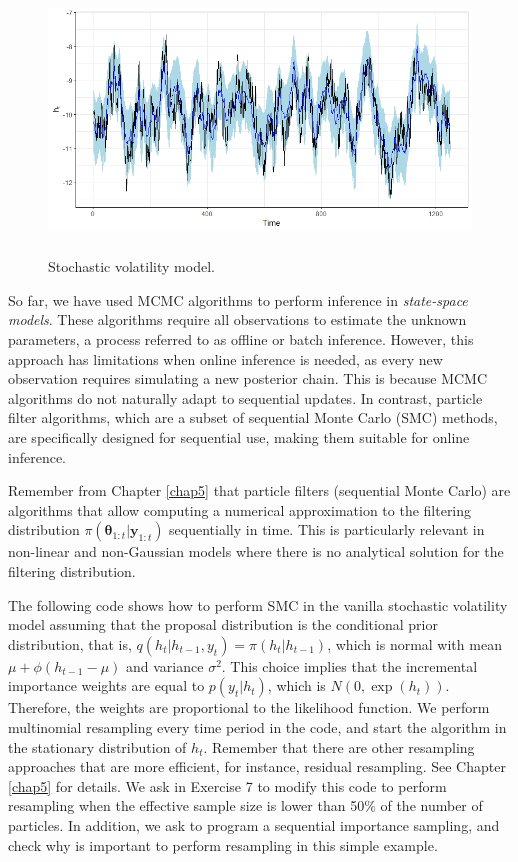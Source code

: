 \begin{figure}[!h]
	\includegraphics[width=340pt, height=200pt]{Chapters/chapter8/figures/SVmodel.png}
	\caption[List of figure caption goes here]{Stochastic volatility model.}\label{fig4}
\end{figure} 

So far, we have used MCMC algorithms to perform inference in \textit{state-space models}. These algorithms require all observations to estimate the unknown parameters, a process referred to as offline or batch inference. However, this approach has limitations when online inference is needed, as every new observation requires simulating a new posterior chain. This is because MCMC algorithms do not naturally adapt to sequential updates. In contrast, particle filter algorithms, which are a subset of sequential Monte Carlo (SMC) methods, are specifically designed for sequential use, making them suitable for online inference.    
     
Remember from Chapter \ref{chap5} that particle filters (sequential Monte Carlo) are algorithms that allow computing a numerical approximation to the filtering distribution $\pi(\bm{\theta}_{1:t}|\bm{y}_{1:t})$ sequentially in time. This is particularly relevant in non-linear and non-Gaussian models where there is no analytical solution for the filtering distribution.

The following code shows how to perform SMC in the vanilla stochastic volatility model assuming that the proposal distribution is the conditional prior distribution, that is, $q(h_t|h_{t-1},y_t)=\pi(h_t|h_{t-1})$, which is normal with mean $\mu+\phi(h_{t-1}-\mu)$ and variance $\sigma^2$. This choice implies that the incremental importance weights are equal to $p(y_t|h_t)$, which is $N(0,\exp(h_t))$. Therefore, the weights are proportional to the likelihood function. We perform multinomial resampling every time period in the code, and start the algorithm in the stationary distribution of $h_t$. Remember that there are other resampling approaches that are more efficient, for instance, residual resampling. See Chapter \ref{chap5} for details. We ask in Exercise 7 to modify this code to perform resampling when the effective sample size is lower than 50\% of the number of particles. In addition, we ask to program a sequential importance sampling, and check why is important to perform resampling in this simple example. 

